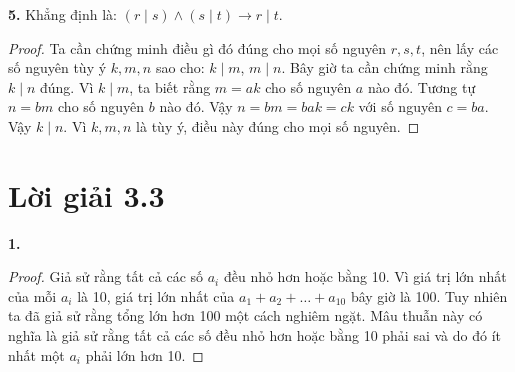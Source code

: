\documentclass[12pt,a4paper]{article}
\theoremstyle{definition}
\begin{document}
\textbf{5.} Khẳng định là: $(r \mid s) \land (s \mid t) \to r \mid t$.

\begin{proof}
Ta cần chứng minh điều gì đó đúng cho mọi số nguyên $r, s, t$, nên lấy các số nguyên tùy ý $k, m, n$ sao cho: $k \mid m$, $m \mid n$.
Bây giờ ta cần chứng minh rằng $k \mid n$ đúng.
Vì $k \mid m$, ta biết rằng $m = ak$ cho số nguyên $a$ nào đó. Tương tự $n = bm$ cho số nguyên $b$ nào đó.
Vậy $n = bm = bak = ck$ với số nguyên $c = ba$.
Vậy $k \mid n$.
Vì $k, m, n$ là tùy ý, điều này đúng cho mọi số nguyên.
\end{proof}

\section*{Lời giải 3.3}

\textbf{1.}

\begin{proof}
Giả sử rằng tất cả các số $a_i$ đều nhỏ hơn hoặc bằng 10. Vì giá trị lớn nhất của mỗi $a_i$ là 10, giá trị lớn nhất của $a_1 + a_2 + \ldots + a_{10}$ bây giờ là 100. Tuy nhiên ta đã giả sử rằng tổng lớn hơn 100 một cách nghiêm ngặt. Mâu thuẫn này có nghĩa là giả sử rằng tất cả các số đều nhỏ hơn hoặc bằng 10 phải sai và do đó ít nhất một $a_i$ phải lớn hơn 10.
\end{proof}
\end{document}
